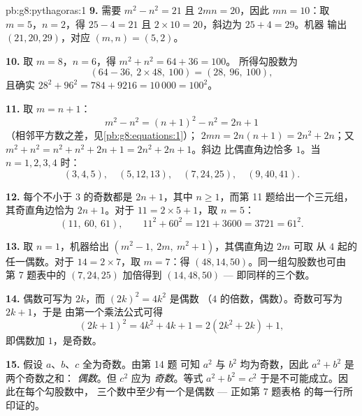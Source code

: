 \begin{solution}{pb:g8:pythagoras:1}
\textbf{9.} 需要 $m^2 - n^2 = 21$ 且 $2mn = 20$，因此
$mn = 10$：取 $m = 5$，$n = 2$，得 $25 - 4 = 21$ 且
$2 \times 10 = 20$，斜边为 $25 + 4 = 29$。机器
输出 $(21, 20, 29)$，对应 $(m, n) = (5, 2)$。

\textbf{10.} 取 $m = 8$，$n = 6$，得 $m^2 + n^2 = 64 + 36 = 100$。
所得勾股数为
\[
\left(64 - 36,\ 2 \times 48,\ 100\right) = (28,\ 96,\ 100),
\]
且确实 $28^2 + 96^2 = 784 + 9216 = 10\,000 = 100^2$。

\textbf{11.} 取 $m = n + 1$：
\[
m^2 - n^2 = (n + 1)^2 - n^2 = 2n + 1
\]
（相邻平方数之差，见\cref{pb:g8:equations:1}）；
$2mn = 2n(n + 1) = 2n^2 + 2n$；又
$m^2 + n^2 = n^2 + n^2 + 2n + 1 = 2n^2 + 2n + 1$。斜边
比偶直角边恰多 $1$。当 $n = 1, 2, 3, 4$ 时：
\[
(3, 4, 5), \quad (5, 12, 13), \quad (7, 24, 25), \quad
(9, 40, 41) .
\]

\textbf{12.} 每个不小于 $3$ 的奇数都是 $2n + 1$，其中
$n \geq 1$，而第 11 题给出一个三元组，其奇直角边恰为
$2n + 1$。对于 $11 = 2 \times 5 + 1$，取 $n = 5$：
\[
(11,\ 60,\ 61),
\qquad
11^2 + 60^2 = 121 + 3600 = 3721 = 61^2 .
\]

\textbf{13.} 取 $n = 1$，机器给出
$\left(m^2 - 1,\ 2m,\ m^2 + 1\right)$，其偶直角边 $2m$ 可取
从 $4$ 起的任一偶数。对于 $14 = 2 \times 7$，取
$m = 7$：得 $(48, 14, 50)$。同一组勾股数也可由
第 7 题表中的 $(7, 24, 25)$ 加倍得到 $(14, 48, 50)$
--- 即同样的三个数。

\textbf{14.} 偶数可写为 $2k$，而 $(2k)^2 = 4k^2$ 是偶数
（$4$ 的倍数，偶数）。奇数可写为 $2k + 1$，于是
由第一个乘法公式可得
\[
(2k + 1)^2 = 4k^2 + 4k + 1 = 2\left(2k^2 + 2k\right) + 1 ,
\]
即偶数加 $1$，是奇数。

\textbf{15.} 假设 $a$、$b$、$c$ 全为奇数。由第 14 题
可知 $a^2$ 与 $b^2$ 均为奇数，因此 $a^2 + b^2$ 是两个奇数之和：
\emph{偶数}。但 $c^2$ 应为 \emph{奇数}。等式
$a^2 + b^2 = c^2$ 于是不可能成立。因此在每个勾股数中，
三个数中至少有一个是偶数 --- 正如第 7 题表格
的每一行所印证的。
\end{solution}
